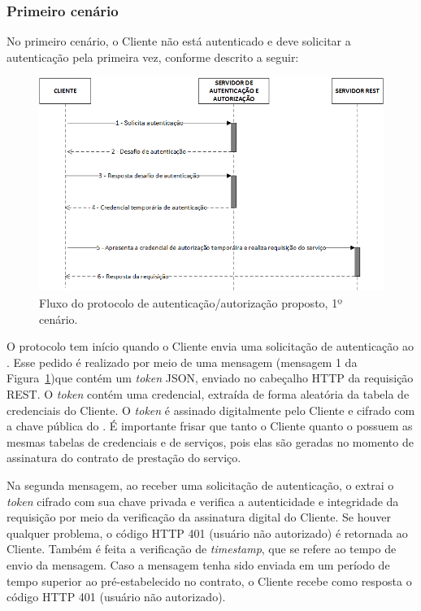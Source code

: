 \subsubsection{Primeiro cenário}

No primeiro cenário, o Cliente não está autenticado e deve solicitar a autenticação pela primeira vez, conforme descrito a seguir:

\begin{figure}[!htb]
    \centering
    \includegraphics[width=1.0\textwidth]{fluxo_autenticacao.png}
    \caption{Fluxo do protocolo de autenticação/autorização proposto, 1º cenário.}
    \label{fig:protocoloseguro}
\end{figure}


O protocolo tem início quando o Cliente envia uma solicitação de autenticação ao \servidorAA.
Esse pedido é realizado por meio de uma mensagem (mensagem 1 da Figura~\ref{fig:protocoloseguro})que contém um \emph{token} JSON, enviado no cabeçalho HTTP da requisição REST. O \emph{token} contém uma credencial, extraída de forma aleatória da tabela de credenciais do Cliente. O \emph{token} é assinado digitalmente pelo Cliente e cifrado com a chave pública do \servidorAA. É importante frisar que tanto o Cliente quanto o \servidorAA{} possuem as mesmas tabelas de credenciais e de serviços, pois elas são geradas no momento de assinatura do contrato de prestação do serviço.

Na segunda mensagem, ao receber uma solicitação de autenticação, o \servidorAA{} extrai o \emph{token} cifrado com sua chave privada e verifica a autenticidade e integridade da requisição por meio da verificação da assinatura digital do Cliente. Se houver qualquer problema, o código HTTP 401 (usuário não autorizado) é retornada ao Cliente.
Também é feita a verificação de \emph{timestamp}, que se refere ao tempo de envio da mensagem. Caso a mensagem tenha
sido enviada em um período de tempo superior ao pré-estabelecido no contrato, o Cliente recebe como resposta o código HTTP 401 (usuário não autorizado).

